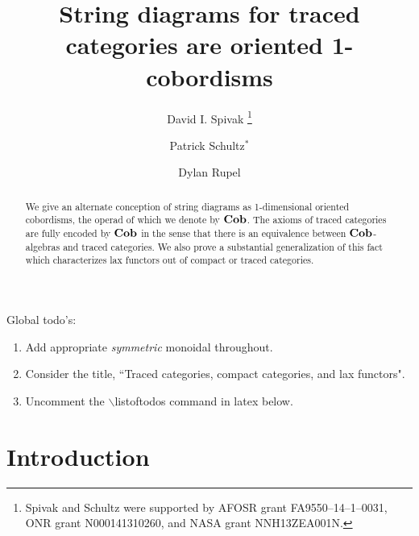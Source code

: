 \documentclass[12pt,oneside,article,draft]{memoir}
\title{String diagrams for traced categories are oriented 1-cobordisms}
\author{
   David I. Spivak
      \thanks{Spivak and Schultz were supported by AFOSR grant FA9550--14--1--0031, ONR grant N000141310260, and NASA grant NNH13ZEA001N.}
   \and Patrick Schultz${}^*$%
   \and Dylan Rupel
}
\begin{document}
\tightlists
\firmlists

\maketitle
\begin{abstract}
   We give an alternate conception of string diagrams as 1-dimensional oriented cobordisms, the
   operad of which we denote by $\mathbf{Cob}$. The axioms of traced categories are fully encoded by $\mathbf{Cob}$
   in the sense that there is an equivalence between $\mathbf{Cob}$-algebras and
   traced categories. We also prove a substantial generalization of this fact which characterizes
   lax functors out of compact or traced categories.
\end{abstract}
Global todo's:
\begin{enumerate}
   \item Add appropriate {\em symmetric\/} monoidal throughout.
   \item Consider the title, ``Traced categories, compact categories, and lax functors".
   \item Uncomment the $\backslash${listoftodos} command in latex below.
\end{enumerate}

\setcounter{tocdepth}{1}
\tableofcontents*

\chapter{Introduction}
\end{document}
